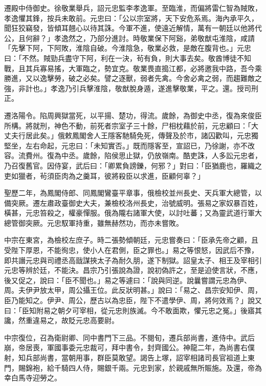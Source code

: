 \begin{pinyinscope}
 遷殿中侍御史。徐敬業舉兵，詔元忠監李孝逸軍。至臨淮，而偏將雷仁智為賊敗，孝逸懼其鋒，按兵未敢前。元忠曰：「公以宗室將，天下安危系焉。海內承平久，聞狂狡竊發，皆傾耳翹心以待其誅。今軍不進，使遠近解情，萬有一朝廷以他將代公，且何辭？」孝逸然之，乃部分進討。時敬業保下阿谿，弟敬猷屯淮陰，咸請「先擊下阿，下阿敗，淮陰自破。今淮陰急，敬業必救，是敵在腹背也。」元忠曰：「不然。賊勁兵盡守下阿，利在一決，茍有負，則大事去矣。敬酋博徒不知戰，且其兵寡易搖，大軍臨之，勢宜克。敬業畏直搗江都，必將邀我中路，吾今乘勝進，又以逸擊勞，破之必矣。譬之逐獸，弱者先禽。今舍必禽之弱，而趨難敵之強，非計也。」孝逸乃引兵擊淮陰，敬猷脫身遁，遂進擊敬業，平之。還。授司刑正。



 遷洛陽令。陷周興獄當死，以平揚、楚功，得流。歲餘，為御史中丞，復為來俊臣所構。將就刑，神色不動，前死者宗室子三十餘，尸相枕藉於前，元忠顧曰：「大丈夫行居此矣。」俄敕鳳閣舍人王隱客馳騎免死，傳聲及於市，諸囚歡叫，元忠獨堅坐，左右命起，元忠曰：「未知實否。」既而隱客至，宣詔已，乃徐謝，亦不改容。流費州。復為中丞。歲餘，陷侯思止獄，仍放嶺南。酷吏誅，人多訟元忠者，乃召復舊官。因侍宴，武后曰：「卿累負謗鑠，何邪？」對曰：「臣猶鹿也，羅織之吏如獵者，茍須臣肉為之羹耳，彼將殺臣以求進，臣顧何辜？」



 聖歷二年，為鳳閣侍郎、同鳳閣鸞臺平章事，俄檢校並州長史、天兵軍大總管，以備突厥。遷左肅政臺御史大夫，兼檢校洛州長史，治號威明。張易之家奴暴百姓，橫甚，元忠笞殺之，權豪憚服。俄為隴右諸軍大使，以討吐蕃；又為靈武道行軍大總管御突厥。元忠馭軍持重，雖無赫然功，而亦未嘗敗。



 中宗在東宮，為檢校左庶子。時二張勢傾朝廷，元忠嘗奏曰：「臣承先帝之顧，且受陛下厚恩，不能徇忠，使小人在君側，臣之罪也。」易之等恨怒，因武后不豫，即共譖元忠與司禮丞高戩謀挾太子為耐久朋，遂下制獄。詔皇太子、相王及宰相引元忠等辨於廷，不能決。昌宗乃引張說為證，說初偽許之，至是迫使言狀，不應，後又促之，說曰：「臣不聞也。」易之等遽曰：「說與同逆。說曩嘗謂元忠為伊、周。夫伊尹放太甲，周公攝王位。此反狀明甚。」說曰：「易之、昌宗安知伊、周，臣乃能知之。伊尹、周公，歷古以為忠臣，陛下不遣學伊、周，將何效焉？」說又曰：「臣知附易之朝夕可宰相，從元忠則族滅。今不敢面欺，懼元忠之冤。」後寤其讒，然重違易之，故貶元忠高要尉。



 中宗復位，召為衛尉卿、同中書門下三品。不閱旬，遷兵部尚書，進侍中。武后崩，帝居喪，軍國事委元忠裁可，拜中書令，封齊國公。神龍二年，為尚書右僕射，知兵部尚書，當朝用事，群臣莫敢望。謁告上塚，詔宰相諸司長官祖道上東門，賜錦袍，給千騎四人侍，賜銀千兩。元忠到家，於親戚無所賑施。及還，帝為幸白馬寺迎勞之。




\end{pinyinscope}
